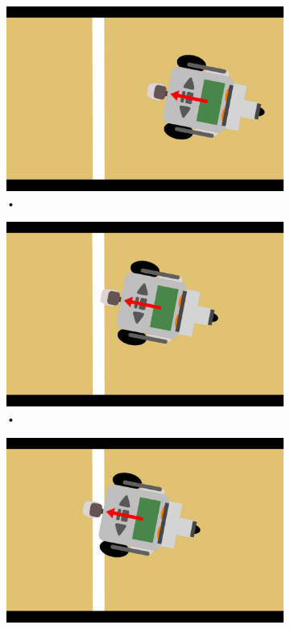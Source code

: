 \documentclass[tt3]{penoverslag}
\begin{document}
\begin{description}
\begin{figure}
\centering
	\begin{subfigure}[h]{0.24\textwidth}
		\includegraphics[width=\textwidth]{WitteLijn1}
		\caption{•}
		\label{fig:AlgoWit1}
	\end{subfigure}
	\begin{subfigure}[h]{0.24\textwidth}
		\includegraphics[width=\textwidth]{WitteLijn2}
		\caption{•}
		\label{fig:AlgoWit2}
	\end{subfigure}
	\begin{subfigure}[h]{0.24\textwidth}
		\includegraphics[width=\textwidth]{WitteLijn3}

\end{subfigure}
\end{figure}
\end{description}
\end{document}
